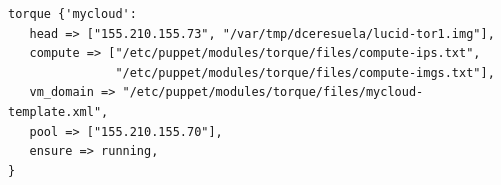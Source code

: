 \begin{lstlisting}
torque {'mycloud':
   head => ["155.210.155.73", "/var/tmp/dceresuela/lucid-tor1.img"],
   compute => ["/etc/puppet/modules/torque/files/compute-ips.txt",
               "/etc/puppet/modules/torque/files/compute-imgs.txt"],
   vm_domain => "/etc/puppet/modules/torque/files/mycloud-template.xml",
   pool => ["155.210.155.70"],
   ensure => running,
}
\end{lstlisting}




